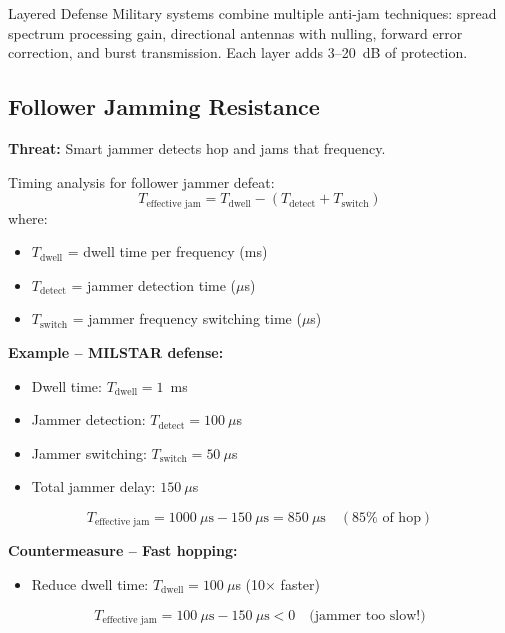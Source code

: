 \begin{calloutbox}{Layered Defense}
Military systems combine multiple anti-jam techniques: spread spectrum processing gain, directional antennas with nulling, forward error correction, and burst transmission. Each layer adds 3--20~dB of protection.
\end{calloutbox}

\subsection{Follower Jamming Resistance}

\textbf{Threat:} Smart jammer detects hop and jams that frequency.

Timing analysis for follower jammer defeat:
\begin{equation}
T_{\text{effective jam}} = T_{\text{dwell}} - (T_{\text{detect}} + T_{\text{switch}})
\end{equation}
where:
\begin{itemize}
\item $T_{\text{dwell}}$ = dwell time per frequency (ms)
\item $T_{\text{detect}}$ = jammer detection time ($\mu$s)
\item $T_{\text{switch}}$ = jammer frequency switching time ($\mu$s)
\end{itemize}

\textbf{Example -- MILSTAR defense:}
\begin{itemize}
\item Dwell time: $T_{\text{dwell}} = 1$~ms
\item Jammer detection: $T_{\text{detect}} = 100~\mu$s
\item Jammer switching: $T_{\text{switch}} = 50~\mu$s
\item Total jammer delay: $150~\mu$s
\end{itemize}
\begin{equation}
T_{\text{effective jam}} = 1000~\mu\text{s} - 150~\mu\text{s} = 850~\mu\text{s} \quad (85\% \text{ of hop})
\end{equation}

\textbf{Countermeasure -- Fast hopping:}
\begin{itemize}
\item Reduce dwell time: $T_{\text{dwell}} = 100~\mu$s (10$\times$ faster)
\end{itemize}
\begin{equation}
T_{\text{effective jam}} = 100~\mu\text{s} - 150~\mu\text{s} < 0 \quad \text{(jammer too slow!)}
\end{equation}

